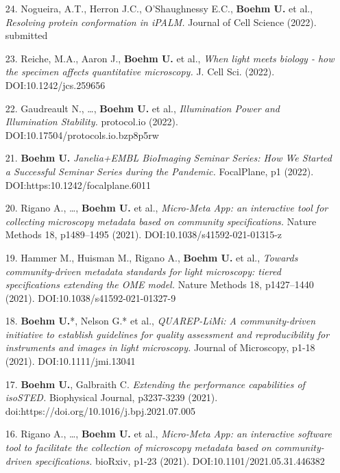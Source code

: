 \documentclass[margin,line]{res}
\begin{document}
\begin{resume}
\begin{enumerate}[leftmargin=*]
\item[24.] Nogueira, A.T., Herron J.C., O’Shaughnessy E.C., {\bf Boehm U.} et al., {\it Resolving protein conformation in iPALM.} Journal of Cell Science (2022). submitted

\item[23.] Reiche, M.A., Aaron J., {\bf Boehm U.} et al., {\it When light meets biology - how the specimen affects quantitative microscopy.} J. Cell Sci. (2022). DOI:10.1242/jcs.259656

\item[22.] Gaudreault N., \dots, {\bf Boehm U.} et al., {\it Illumination Power and Illumination Stability.} protocol.io (2022). DOI:10.17504/protocols.io.bzp8p5rw

\item[21.] {\bf Boehm U.} {\it Janelia+EMBL BioImaging Seminar Series: How We Started a Successful Seminar Series during the Pandemic.} FocalPlane, p1 (2022). DOI:https:10.1242/focalplane.6011

\item[20.] Rigano A., \dots, {\bf Boehm U.} et al., {\it Micro-Meta App: an interactive tool for collecting microscopy metadata based on community specifications.} Nature Methods 18, p1489–1495 (2021). DOI:10.1038/s41592-021-01315-z

\item[19.] Hammer M., Huisman M., Rigano A., {\bf Boehm U.} et al., {\it Towards community-driven metadata standards for light microscopy: tiered specifications extending the OME model.} Nature Methods 18, p1427–1440 (2021). DOI:10.1038/s41592-021-01327-9

\item[18.] {\bf Boehm U.}*, Nelson G.* et al., {\it QUAREP-LiMi: A community-driven initiative to establish guidelines for quality assessment and reproducibility for instruments and images in light microscopy.} Journal of Microscopy, p1-18 (2021). DOI:10.1111/jmi.13041

\item[17.] {\bf Boehm U.}, Galbraith C. {\it Extending the performance capabilities of isoSTED.} Biophysical Journal, p3237-3239 (2021). doi:https://doi.org/10.1016/j.bpj.2021.07.005

\item[16.] Rigano A., \dots, {\bf Boehm U.} et al., {\it Micro-Meta App: an interactive software tool to facilitate the collection of microscopy metadata based on community-driven specifications.} bioRxiv, p1-23 (2021). DOI:10.1101/2021.05.31.446382


\end{enumerate}
\end{resume}
\end{document}
